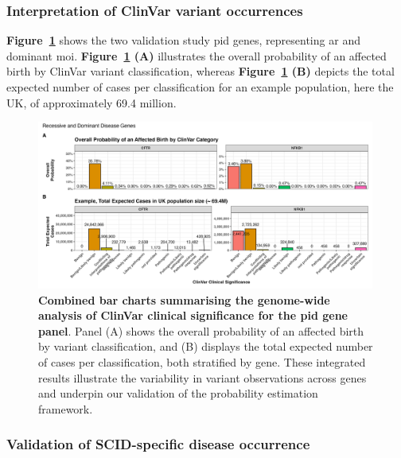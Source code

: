 \subsubsection{Interpretation of ClinVar variant occurrences}

\textbf{Figure~\ref{fig:all_genes_combined_bar_charts_mini}} shows  the two validation study \ac{pid} genes, representing \ac{ar} and dominant \ac{moi}. \textbf{Figure~\ref{fig:all_genes_combined_bar_charts_mini} (A)}   illustrates the overall probability of an affected birth by ClinVar variant classification, whereas \textbf{Figure~\ref{fig:all_genes_combined_bar_charts_mini}  (B)}  depicts the total expected number of cases per classification for an example population, here the UK, of approximately 69.4 million. 

\begin{figure}[h]
  \centering
  \includegraphics[width=0.99\textwidth]{../images/all_genes_combined_bar_charts_mini.png}
  \caption{\textbf{Combined bar charts summarising the genome-wide analysis of ClinVar clinical significance for the \ac{pid} gene panel}. Panel (A) shows the overall probability of an affected birth by variant classification, and (B) displays the total expected number of cases per classification, both stratified by gene. These integrated results illustrate the variability in variant observations across genes and underpin our validation of the probability estimation framework.}
  \label{fig:all_genes_combined_bar_charts_mini}
\end{figure}

\subsubsection{Validation of SCID-specific disease occurrence}

